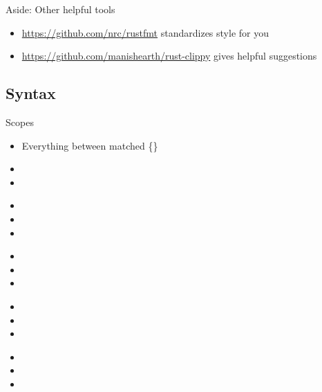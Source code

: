 \documentclass[50pt]{beamer}
\begin{document}
\begin{frame}
    Aside: Other helpful tools
    \begin{itemize}
        \item \url{https://github.com/nrc/rustfmt} standardizes style for you
        \item \url{https://github.com/manishearth/rust-clippy} gives helpful suggestions
    \end{itemize}
\end{frame}

\subsection{Syntax}

\begin{frame}
    Scopes
    \begin{itemize}
        \item Everything between matched \{\}
        \item
        \item
    \end{itemize}
\end{frame}

\begin{frame}
    \begin{itemize}
        \item
        \item
        \item
    \end{itemize}
\end{frame}

\begin{frame}
    \begin{itemize}
        \item
        \item
        \item
    \end{itemize}
\end{frame}

\begin{frame}
    \begin{itemize}
        \item
        \item
        \item
    \end{itemize}
\end{frame}

\begin{frame}
    \begin{itemize}
        \item
        \item
        \item
    \end{itemize}
\end{frame}
\end{document}
